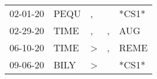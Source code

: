 \begin{supertabular}{p{0.07\textwidth}p{0.06\textwidth}p{0.02\textwidth}p{0.02\textwidth}p{0.06\textwidth}}
          02-01-20\textsuperscript{} &           PEQU\textsuperscript{} &                , &                  &                            *CS1* \\
          02-29-20\textsuperscript{} &           TIME\textsuperscript{} &                , &                , &            AUG\textsuperscript{} \\
          06-10-20\textsuperscript{} &           TIME\textsuperscript{} &     \textgreater &                , &           REME\textsuperscript{} \\
          09-06-20\textsuperscript{} &           BILY\textsuperscript{} &     \textgreater &                  &                            *CS1* \\
\end{supertabular}
